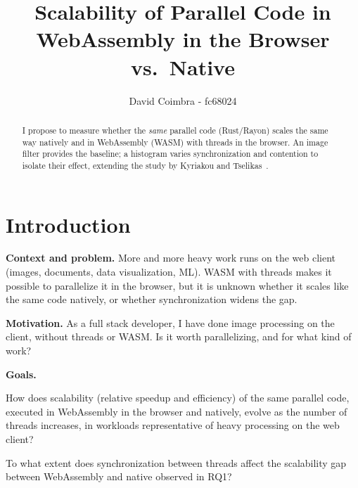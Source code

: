 \documentclass[sigplan]{acmart}
\begin{document}
\raggedbottom

\title{Scalability of Parallel Code in WebAssembly in the Browser vs.\ Native}

\author{David Coimbra - fc68024}

\begin{abstract}
I propose to measure whether the \emph{same} parallel code (Rust/Rayon) scales
the same way natively and in WebAssembly (WASM) with threads in the browser. An
image filter provides the baseline; a histogram varies synchronization and
contention to isolate their effect, extending the study by Kyriakou and
Tselikas~\cite{kyriakou2022}.
\end{abstract}


\pagestyle{plain} %

\maketitle

\section{Introduction}

\noindent\textbf{Context and problem.} More and more heavy work runs on the web
client (images, documents, data visualization, ML). WASM with threads makes it
possible to parallelize it in the browser, but it is unknown whether it scales
like the same code natively, or whether synchronization widens the gap.

\noindent\textbf{Motivation.} As a full stack developer, I have done image
processing on the client, without threads or WASM. Is it worth parallelizing,
and for what kind of work?

\noindent\textbf{Goals.}
\begin{description}[nosep]
  \item[RQ1] How does scalability (relative speedup and efficiency) of the same
  parallel code, executed in WebAssembly in the browser and natively, evolve as
  the number of threads increases, in workloads representative of heavy
  processing on the web client?
  \item[RQ2] To what extent does synchro\-nization between threads affect the
  scalability gap between Web\-Assembly and native observed in RQ1?
\end{description}
\end{document}
